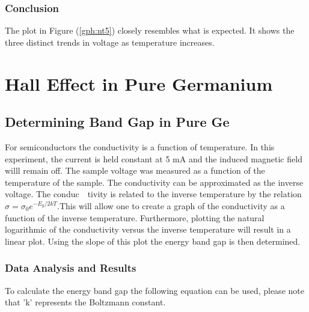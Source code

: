 \documentclass[a4paper]{article}
\begin{document}
\subsubsection{Conclusion}
\qq The plot in Figure (\ref{gph:nt5}) closely resembles what is expected. It
shows the three distinct trends in voltage as temperature increases.

\newpage

\section{Hall Effect in Pure Germanium}

\subsection{Determining Band Gap in Pure Ge}

\qq For semiconductors the conductivity is a function of
temperature. In this experiment, the current is held constant at 5 mA
and the induced magnetic field willl remain off. The sample voltage
was measured as a function of the temperature of the sample. The
conductivity can be approximated as the inverse voltage. The
conduc\ \ tivity is related to the inverse temperature by the relation
$\sigma = \sigma_0 e^{-E_g/2kT}$.This will allow one to create a graph
of the conductivity as a function of the inverse
temperature. Furthermore, plotting the natural logarithmic of the
conductivity versus the inverse temperature will result in a linear
plot. Using the slope of this plot the energy band gap is then
determined.

\subsubsection{Data Analysis and Results}
\qq To calculate the energy band gap the following equation can be
used, please note that 'k' represents the Boltzmann constant.
\end{document}
